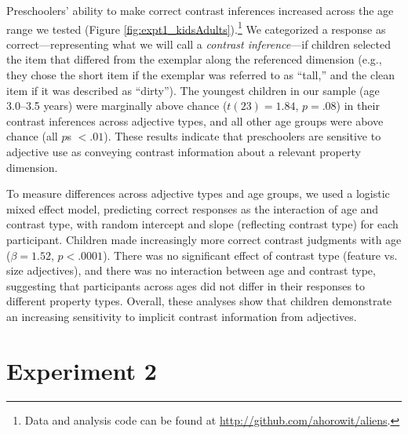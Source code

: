 \documentclass[man]{apa2}
\begin{document}
Preschoolers' ability to make correct contrast inferences increased across the age range we tested (Figure \ref{fig:expt1_kidsAdults}).\footnote{Data and analysis code can be found at \url{http://github.com/ahorowit/aliens}.} We categorized a response as correct---representing what we will call a \emph{contrast inference}---if children selected the item that differed from the exemplar along the referenced dimension (e.g., they chose the short item if the exemplar was referred to as ``tall,'' and the clean item if it was described as ``dirty'').  The youngest children in our sample (age 3.0--3.5 years) were marginally above chance ($t(23) = 1.84$, $p = .08$) in their contrast inferences across adjective types, and all other age groups were above chance (all $p$s $< .01$). These results indicate that preschoolers are sensitive to adjective use as conveying contrast information about a relevant property dimension.



To measure differences across adjective types and age groups, we used a logistic mixed effect model, predicting correct responses as the interaction of age and contrast type, with random intercept and slope (reflecting contrast type) for each participant.  Children made increasingly more correct contrast judgments with age ($\beta = 1.52$, $p < .0001$). There was no significant effect of contrast type (feature vs. size adjectives), and there was no interaction between age and contrast type, suggesting that participants across ages did not differ in their responses to different property types.  Overall, these analyses show that children demonstrate an increasing sensitivity to implicit contrast information from adjectives.  





\section{Experiment 2}
\end{document}
